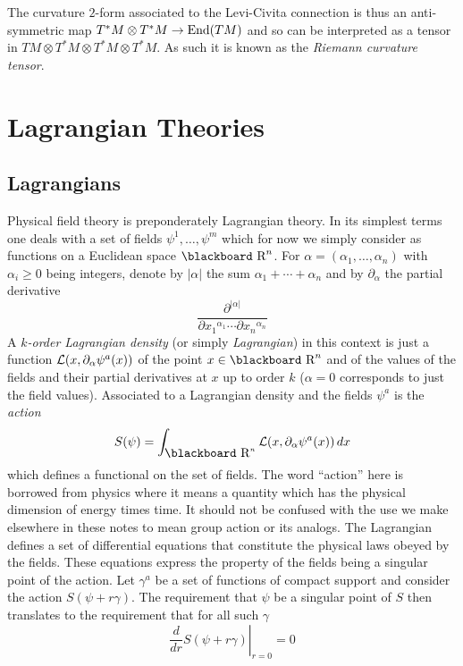 \documentclass[12pt,titlepage]{article}
\def\bbf#1{\hbox{\blackboard #1}}
\def\lR{\bbf R}
\def\cL{{\cal L}}
\def\End{\hbox{End}}
\begin{document}
The curvature \(2\)-form associated to the Levi-Civita connection is thus 
an anti-symmetric map \(T^*M\otimes T^*M \to \End(TM)\) and so can be 
interpreted as a tensor in \(TM\otimes T^*M\otimes T^*M \otimes T^*M \). As 
such it is known as  
the {\em Riemann curvature tensor\/}.
%

\section{Lagrangian Theories}%
\subsection{Lagrangians}\label{sec:lagrange}%
Physical field theory is preponderately
Lagrangian theory. In its simplest terms one deals with a set of
fields \(\psi^1,\dots,\psi^m\) which for now we simply consider as
functions on a Euclidean space \(\lR^n\). For 
\(\alpha=(\alpha_1,\dots,\alpha_n)\) with \(\alpha_i\ge 0\) being
integers, denote by \(|\alpha|\) the sum 
\(\alpha_1+\cdots+\alpha_n\) and by \(\partial_\alpha\) 
the partial derivative
\[
\frac{\partial^{|\alpha|}}
{\partial x_1{}^{\alpha_1}\cdots \partial x_n{}^{\alpha_n}}
\]
 A {\em \(k\)-order Lagrangian density\/}
%
% 
(or simply {\em Lagrangian\/}) in this
context is
just a function
\(\cL(x,\partial_\alpha\psi^a(x))\) of the point
\(x\in \lR^n\) and of the values of the fields and their partial
derivatives at \(x\) up to order \(k\) (\(\alpha=0\) corresponds to
just the field values). 
Associated to a Lagrangian  density and the fields
\(\psi^a\) is the {\em action\/}
%
\begin{equation}\label{eq:action}%
S(\psi) = \int_{\lR^n} \cL(x,\partial_\alpha\psi^a(x))\,dx
\end{equation}%
which defines a functional on the set of fields.
The word ``action'' here is borrowed from  physics where it means a quantity
which has the physical dimension of energy times time. It should not be
confused with the use we make elsewhere in these notes to mean group
action or its analogs.
The Lagrangian defines a set of differential equations that constitute
the physical laws obeyed  by the fields. These equations express the
property of the fields being a singular point of the action.  Let
\(\gamma^a\) be a set of functions of compact support and consider the
action \(S(\psi+r\gamma)\). The requirement that \(\psi\) be a singular
point of \(S\) then translates to the requirement that for all such 
\(\gamma\)
\[%
\left.\frac{d}{dr}S(\psi+r\gamma)\right|_{r=0} = 0
\]
\end{document}
